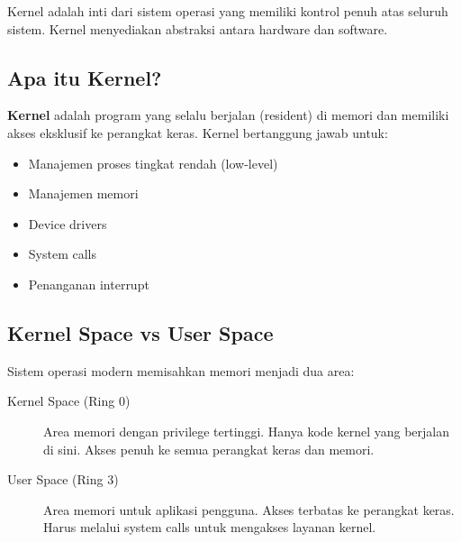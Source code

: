 Kernel adalah inti dari sistem operasi yang memiliki kontrol penuh atas seluruh sistem. Kernel menyediakan abstraksi antara hardware dan software.

\subsection{Apa itu Kernel?}

\textbf{Kernel} adalah program yang selalu berjalan (resident) di memori dan memiliki akses eksklusif ke perangkat keras. Kernel bertanggung jawab untuk:

\begin{itemize}
    \item Manajemen proses tingkat rendah (low-level)
    \item Manajemen memori
    \item Device drivers
    \item System calls
    \item Penanganan interrupt
\end{itemize}

\subsection{Kernel Space vs User Space}

Sistem operasi modern memisahkan memori menjadi dua area:

\begin{description}
    \item[Kernel Space (Ring 0)] Area memori dengan privilege tertinggi. Hanya kode kernel yang berjalan di sini. Akses penuh ke semua perangkat keras dan memori.

    \item[User Space (Ring 3)] Area memori untuk aplikasi pengguna. Akses terbatas ke perangkat keras. Harus melalui system calls untuk mengakses layanan kernel.
\end{description}

